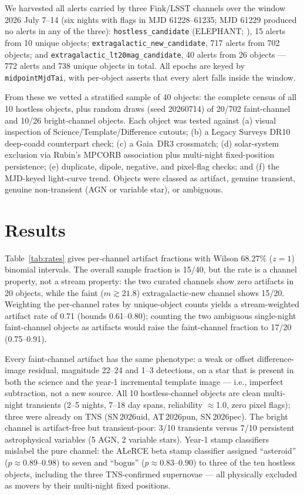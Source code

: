 \documentclass[RNAAS]{aastex701}
\begin{document}
We harvested all alerts carried by three Fink/LSST channels over the window
2026 July 7--14 (six nights with flags in MJD 61228--61235; MJD 61229 produced
no alerts in any of the three): \texttt{hostless\_candidate} (ELEPHANT;
\citealt{Pessi2024}), 15 alerts from 10 unique objects;
\texttt{extragalactic\_new\_candidate}, 717 alerts from 702 objects; and
\texttt{extragalactic\_lt20mag\_candidate}, 40 alerts from 26 objects ---
772 alerts and 738 unique objects in total. All epochs are keyed by
\texttt{midpointMjdTai}, with per-object asserts that every alert falls inside
the window.

From these we vetted a stratified sample of 40 objects: the complete census of
all 10 hostless objects, plus random draws (seed 20260714) of 20/702 faint-channel
and 10/26 bright-channel objects. Each object was tested against (a) visual
inspection of Science/Template/Difference cutouts; (b) a Legacy Surveys DR10
\citep{Dey2019} deep-coadd counterpart check; (c) a Gaia~DR3
\citep{GaiaDR3} crossmatch; (d) solar-system exclusion via Rubin's MPCORB
association plus multi-night fixed-position persistence; (e) duplicate, dipole,
negative, and pixel-flag checks; and (f) the MJD-keyed light-curve trend.
Objects were classed as artifact, genuine transient, genuine non-transient
(AGN or variable star), or ambiguous.

\section{Results}

Table~\ref{tab:rates} gives per-channel artifact fractions with Wilson 68.27\%
($z{=}1$) binomial intervals. The overall sample fraction is 15/40, but the
rate is a channel property, not a stream property: the two curated channels
show zero artifacts in 20 objects, while the faint
($m \gtrsim 21.8$) extragalactic-new channel shows 15/20. Weighting the
per-channel rates by unique-object counts yields a stream-weighted artifact
rate of 0.71 (bounds 0.61--0.80); counting the two ambiguous single-night
faint-channel objects as artifacts would raise the faint-channel fraction to
17/20 (0.75--0.91).

Every faint-channel artifact has the same phenotype: a weak or offset
difference-image residual, magnitude 22--24 and 1--3 detections, on a star
that is present in both the science and the year-1 incremental template image
--- i.e., imperfect subtraction, not a new source. All 10 hostless-channel
objects are clean multi-night transients (2--5 nights, 7--18 day spans,
reliability $\approx$1.0, zero pixel flags); three were already on TNS
(SN\,2026uid, AT\,2026pun, SN\,2026pec). The bright channel is artifact-free
but transient-poor: 3/10 transients versus 7/10 persistent astrophysical
variables (5 AGN, 2 variable stars). Year-1 stamp classifiers mislabel the
pure channel: the ALeRCE beta stamp classifier \citep[v2.0.1
lineage;][]{CarrascoDavis2021} assigned ``asteroid'' ($p \approx 0.89$--$0.98$)
to seven and ``bogus'' ($p \approx 0.83$--$0.90$) to three of the ten hostless
objects, including the three TNS-confirmed supernovae --- all physically
excluded as movers by their multi-night fixed positions.
\end{document}
